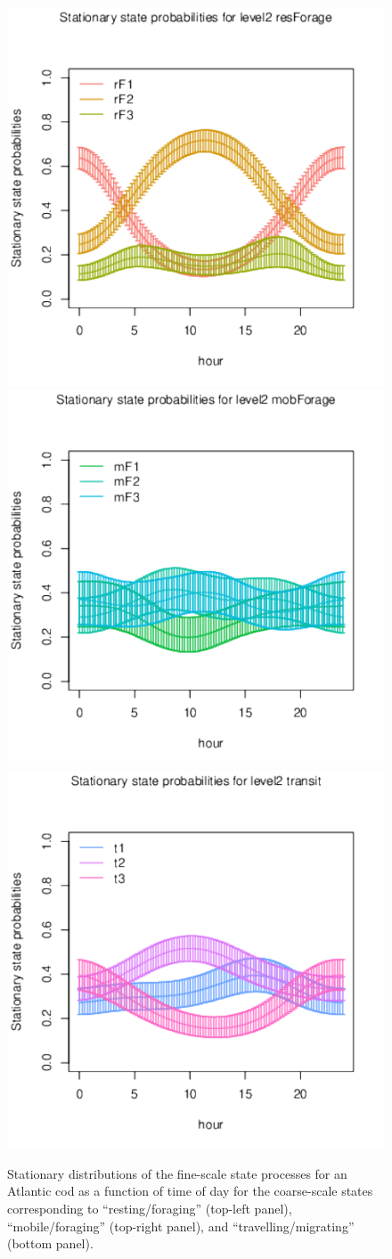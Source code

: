 \documentclass[12pt]{article}\usepackage[]{graphicx}\usepackage[]{xcolor}
\begin{document}
\begin{figure}[htbp]
  \centering
  \includegraphics[width=.49\textwidth]{plot_codStationary001.pdf}
  \includegraphics[width=.49\textwidth]{plot_codStationary002.pdf}
  \includegraphics[width=.49\textwidth]{plot_codStationary003.pdf}
  \caption{Stationary distributions of the fine-scale state processes for an Atlantic cod as a function of time of day for the coarse-scale states corresponding to ``resting/foraging'' (top-left panel), ``mobile/foraging'' (top-right panel), and ``travelling/migrating'' (bottom panel).}
  \label{fig:codStat}
\end{figure}
\end{document}
